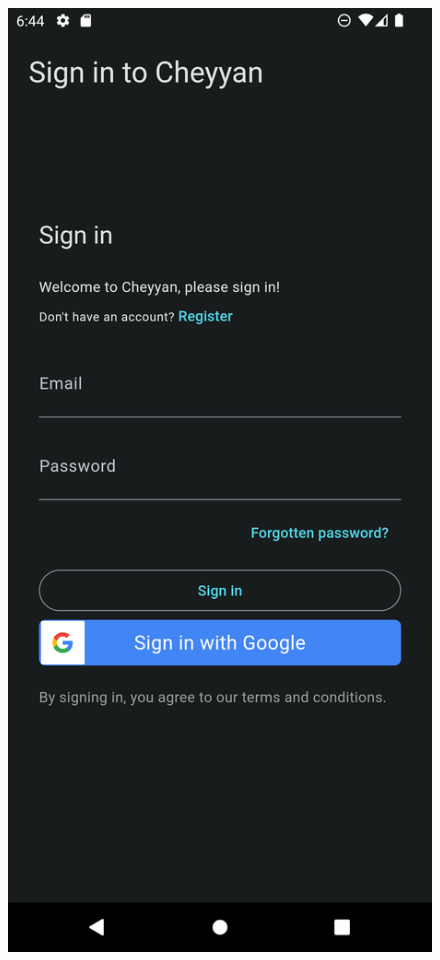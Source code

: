 \documentclass{l4proj}
\begin{document}
\begin{figure}
\centering
\begin{minipage}{.5\textwidth}
  \centering
  \includegraphics[width=.6\linewidth]{images/SignUp.png}
  \label{fig:SignUp}
\end{minipage}%
\begin{minipage}{.5\textwidth}
  \centering

\end{minipage}
\end{figure}
\end{document}
